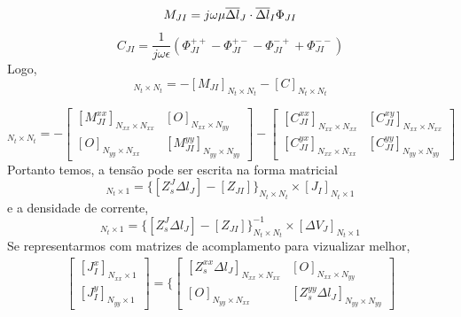 \documentclass[
	12pt,				%
	openright,			%
	oneside,			%
	a4paper,			%
	english,			%
	brazil				%
	]{abntex2}
\begin{document}
\begin{apendicesenv}
\begin{equation}
   M_{JI}=   
j\omega \mu  \overline{\Delta l}_J \cdot \overline{\Delta l}_I  \Phi_{JI}\\ 
 \\
\end{equation}
\begin{equation}
   C_{JI}=   
 \frac{1}{j \omega \epsilon}  (\Phi_{JI}^{++}-\Phi_{JI}^{+-}-\Phi_{JI}^{-+}+\Phi_{JI}^{--})
\end{equation}
Logo,
\begin{equation}
    [Z_{JI}]_{N_t \times N_t}=-[M_{JI}]_{N_t \times N_t}-[C]_{N_t \times N_t}
\end{equation}

\begin{equation}
 [Z_{JI}]_{N_t \times N_t}=-
   \begin{bmatrix}[M_{JI}^{xx}]_{N_{xx}\times N_{xx}}& [O]_{N_{xx}\times N_{yy}}\\
   [O]_{N_{yy}\times N_{xx}}&[M_{JI}^{yy}]_{N_{yy}\times N_{yy}}
   \end{bmatrix}-
   \begin{bmatrix}[C_{JI}^{xx}]_{N_{xx}\times N_{xx}}& [C_{JI}^{xy}]_{N_{xx}\times N_{xx}}\\
   [C_{JI}^{yx}]_{N_{xx}\times N_{xx}}&[C_{JI}^{yy}]_{N_{yy}\times N_{yy}}
   \end{bmatrix}
\end{equation}
Portanto temos, a tensão pode ser escrita na forma matricial
\begin{equation}
  [\Delta V_J]_{N_t \times 1} =\{ [Z_{s}^J\Delta l_J]-[Z_{JI}]\}_{N_t \times N_t}\times[J_I]_{N_t \times 1}
\end{equation} 
e a densidade de corrente,
\begin{equation}
  [J_I]_{N_t \times 1}=\{ [Z_{s}^J\Delta l_J]-[Z_{JI}]\}^{-1}_{N_t \times N_t} \times[\Delta V_J]_{N_t \times 1} 
\end{equation} 
Se representarmos com matrizes de acomplamento  para vizualizar melhor,
\begin{equation}
\begin{aligned}
  \begin{bmatrix} [J^{x}_I]_{N_{xx}\times 1} \\ [J^{y}_I]_{N_{yy}\times 1}\end{bmatrix}  =\Biggl\{\begin{bmatrix}[Z_s^{xx}\Delta l_J]_{N_{xx}\times N_{xx}}& [O]_{N_{xx}\times N_{yy}}\\
   [O]_{N_{yy}\times N_{xx}}&[Z_s^{yy}\Delta l_J]_{N_{yy}\times N_{yy}}

\end{bmatrix}
\end{aligned}
\end{equation}
\end{apendicesenv}
\end{document}
